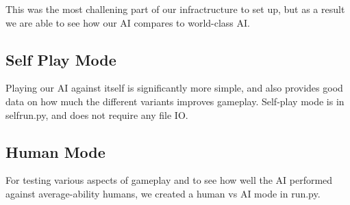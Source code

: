 \documentclass[12pt]{article}
\begin{document}
This was the most challening part of our infractructure to set up, but
as a result we are able to see how our AI compares to  world-class
AI.

\subsection*{Self Play Mode}
Playing our AI against itself is significantly more simple, and also
provides good data on how much the different variants improves
gameplay. Self-play mode is in selfrun.py, and does not require any
file IO.

\subsection*{Human Mode}

For testing various aspects of gameplay and to see how well the AI
performed against average-ability humans, we created a human vs AI
mode in run.py.
\end{document}
